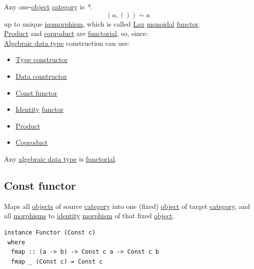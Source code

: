 \documentclass[11pt]{article}
\begin{document}
Any one-\hyperref[org4be0e9d]{object} \hyperref[org0450535]{category} is \emph{*}.\\

$$ (a, ()) \sim a $$ up to unique \hyperref[org91df03a]{isomorphism}, which is called \hyperref[org40220c9]{Lax} \hyperref[orgac4647e]{monoidal} \hyperref[orgf2f6841]{functor}.\\

\hyperref[org80a0b6e]{Product} and \hyperref[org4de405e]{coproduct} are \hyperref[org443767a]{functorial}, so, since:\\
\hyperref[org2278a14]{Algebraic data type} construction can use:\\
\begin{itemize}
\item \hyperref[org385fa30]{Type constructor}\\
\item \hyperref[org1fbdcfd]{Data constructor}\\
\item \hyperref[org5787257]{Const functor}\\
\item \hyperref[org9b95fd5]{Identity} \hyperref[orgf2f6841]{functor}\\
\item \hyperref[org80a0b6e]{Product}\\
\item \hyperref[org4de405e]{Coproduct}\\
\end{itemize}

Any \hyperref[org2278a14]{algebraic data type} is \hyperref[org443767a]{functorial}.\\

\subsection{\label{org5787257}Const functor}
\label{sec:org6c29821}

Maps all \hyperref[org363acc2]{objects} of source \hyperref[org0450535]{category} into one (fixed) \hyperref[org4be0e9d]{object} of target \hyperref[org0450535]{category}, and all \hyperref[org6c2fa5c]{morphisms} to \hyperref[org9b95fd5]{identity} \hyperref[org5de09d4]{morphism} of that fixed \hyperref[org4be0e9d]{object}.\\

\begin{verbatim}
instance Functor (Const c)
 where
  fmap :: (a -> b) -> Const c a -> Const c b
  fmap _ (Const c) = Const c
\end{verbatim}
\end{document}
